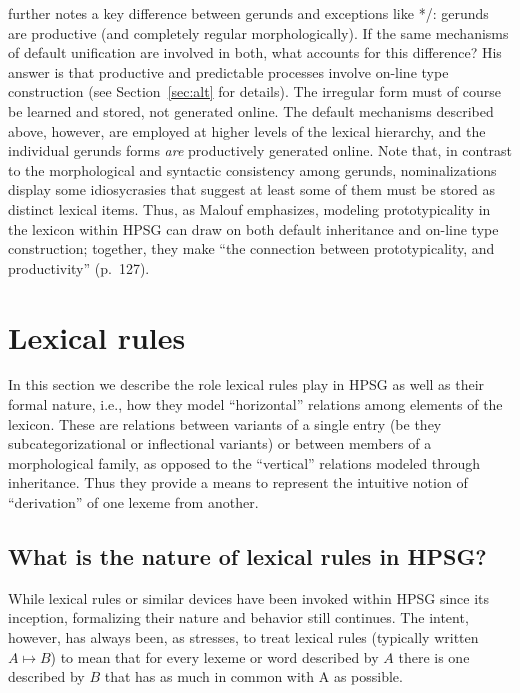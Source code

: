 \documentclass[output=paper
 	        ,biblatex
                ,babelshorthands
                ,newtxmath
                ,draftmode
                ,colorlinks, citecolor=brown
]{langscibook}
\begin{document}
\citeauthor{Malouf2000a} further notes a key difference between gerunds and exceptions like */:  gerunds are productive (and completely regular morphologically).
If the same mechanisms of default unification are involved in both, what accounts for this difference?
His answer is that productive and predictable processes involve on-line type construction (see Section~\ref{sec:alt} for details).
The irregular form  must of course be learned and stored, not generated online.
The default mechanisms described above, however, are employed at higher levels of the lexical hierarchy, and the individual gerunds forms \emph{are} productively generated online.
Note that, in contrast to the morphological and syntactic consistency among gerunds,  nominalizations display some idiosycrasies that suggest at least some of them must be stored as distinct lexical items.
Thus, as Malouf emphasizes, modeling prototypicality in the lexicon within HPSG can draw on both default inheritance and on-line type construction; together, they make ``the connection between prototypicality, and productivity'' (p.\ 127).

\section{Lexical rules}
\label{lexicon-sec-lexical-rules}


In this section we describe the role lexical rules play in HPSG as well as their formal nature, i.e., how they model ``horizontal'' relations among elements of the lexicon. These are relations between variants of a single entry (be they subcategorizational or inflectional variants) or between members of a morphological family, as opposed to the ``vertical'' relations modeled through inheritance. Thus they provide a means to represent the intuitive notion of ``derivation'' of one lexeme from another. 

\subsection{What is the nature of lexical rules in HPSG?}

While lexical rules or similar devices have been invoked within HPSG since its inception, formalizing their nature and behavior still  continues.
The intent, however, has always been, as \citet{Lahm2016} stresses, to treat lexical rules (typically written $A \mapsto B$) to mean that for every lexeme or word described by $A$ there is one described by $B$ that has as much in common with A as possible.
\end{document}
